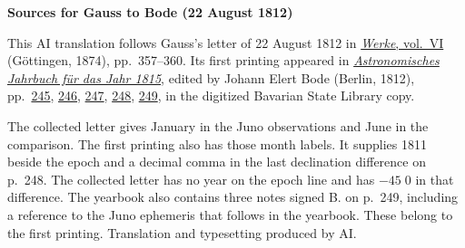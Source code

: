 \clearpage\thispagestyle{empty}
\begin{center}\textbf{Sources for Gauss to Bode (22 August 1812)}\end{center}
\noindent This AI translation follows Gauss’s letter of 22 August 1812 in \href{https://gdz.sub.uni-goettingen.de/id/PPN236007467}{\textit{Werke}, vol.~VI} (Göttingen, 1874), pp.~357--360. Its first printing appeared in \href{https://api.digitale-sammlungen.de/iiif/image/v2/bsb10538344_00005/full/1600,/0/default.jpg}{\textit{Astronomisches Jahrbuch für das Jahr 1815}}, edited by Johann Elert Bode (Berlin, 1812), pp.~\href{https://api.digitale-sammlungen.de/iiif/image/v2/bsb10538344_00253/full/1600,/0/default.jpg}{245}, \href{https://api.digitale-sammlungen.de/iiif/image/v2/bsb10538344_00254/full/1600,/0/default.jpg}{246}, \href{https://api.digitale-sammlungen.de/iiif/image/v2/bsb10538344_00255/full/1600,/0/default.jpg}{247}, \href{https://api.digitale-sammlungen.de/iiif/image/v2/bsb10538344_00256/full/1600,/0/default.jpg}{248}, \href{https://api.digitale-sammlungen.de/iiif/image/v2/bsb10538344_00257/full/1600,/0/default.jpg}{249}, in the digitized Bavarian State Library copy.
\par\smallskip\noindent The collected letter gives January in the Juno observations and June in the comparison. The first printing also has those month labels. It supplies 1811 beside the epoch and a decimal comma in the last declination difference on p.~248. The collected letter has no year on the epoch line and has $-45\;0$ in that difference. The yearbook also contains three notes signed B. on p.~249, including a reference to the Juno ephemeris that follows in the yearbook. These belong to the first printing. Translation and typesetting produced by AI.
\clearpage
